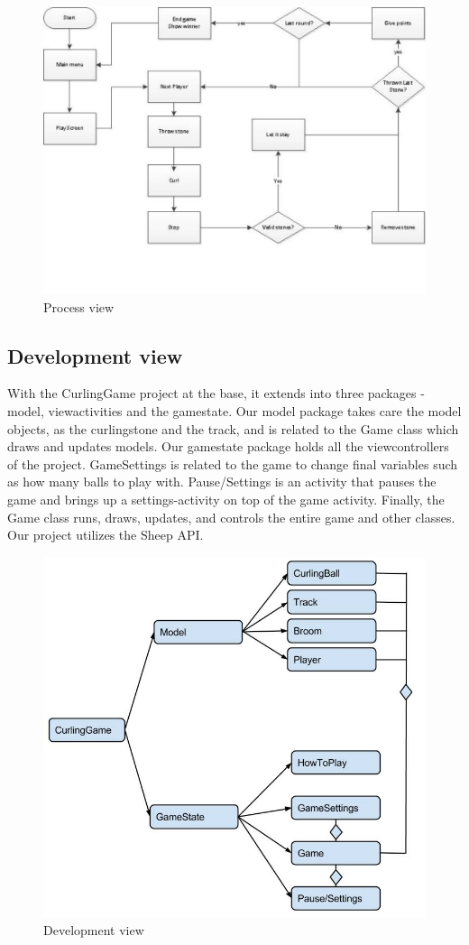 \begin{figure}[ht!]
	\centering
	\includegraphics[width=150mm]{view.jpg}
	\caption{Process view}
	\label{fig:viewpoint}
\end{figure}

\newpage
\subsection{Development view}
With the CurlingGame project at the base, it extends into three packages - model, viewactivities and the gamestate. Our model package takes care the model objects, as the curlingstone and the track, and is related to the Game class which draws and updates models. Our gamestate package holds all the viewcontrollers of the project. GameSettings is related to the game to change final variables such as how many balls to play with. Pause/Settings is an activity that pauses the game and brings up a settings-activity on top of the game activity. Finally, the Game class runs, draws, updates, and controls the entire game and other classes. Our project utilizes the Sheep API.\\

\begin{figure}[ht!]
	\centering
	\includegraphics[width=150mm]{development_view.jpg}
	\caption{Development view}
	\label{fig:viewpoint}
\end{figure}
\newpage

